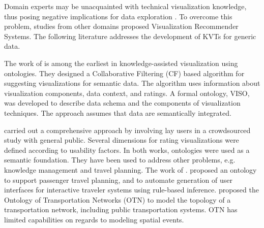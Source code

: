 \documentclass[]{interact}
\theoremstyle{plain}%
\theoremstyle{definition}
\theoremstyle{remark}
\theoremstyle{definition}
\begin{document}
Domain experts may be unacquainted with technical visualization knowledge, thus posing negative implications for data exploration \citep{Mutlu2016}. To overcome this problem, studies from other domains proposed Visualization Recommender Systems. The following literature addresses the development of KVTs for generic data.



The work of \citet{Voigt2013} is among the earliest in knowledge-assisted visualization using ontologies. They designed a Collaborative Filtering (CF) based algorithm for suggesting visualizations for semantic data. The algorithm uses information about visualization components, data context, and ratings. A formal ontology, VISO, was developed to describe data schema and the components of visualization techniques. The approach assumes that data are semantically integrated.

 \citet{Mutlu2016} carried out a comprehensive approach by involving lay users in a crowdsourced study with general public. Several dimensions for rating visualizations were defined according to usability factors. In both works, ontologies were used as a semantic foundation. They have been used to address other problems, e.g. knowledge management and travel planning. The work of \citet{deOliveira2013}. proposed an ontology to support passenger travel planning, and to automate generation of user interfaces for interactive traveler systems using rule-based inference.  \citet{Lorenz2005} proposed the Ontology of Transportation Networks (OTN) to model the topology of a transportation network, including public transportation systems. OTN has limited capabilities on regards to modeling spatial events.
\end{document}
